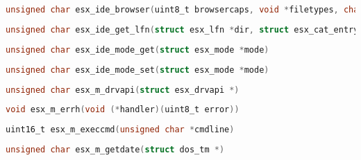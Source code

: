 \documentclass[11pt]{book}
\def\lthtmlcheckvsize{\ifdim\ht\sizebox<\vsize 
  \ifdim\wd\sizebox<\hsize\expandafter\hfill\fi \expandafter\vfill
  \else\expandafter\vss\fi}%
\begin{document}
{\newpage\clearpage
{}%
\begin{lstlisting}[language=C]
unsigned char esx_ide_browser(uint8_t browsercaps, void *filetypes, char *help,char *dst_sfn, char *dst_lfn)
\end{lstlisting}%
\lthtmlfigureZ
\lthtmlcheckvsize\clearpage}

{\newpage\clearpage
{}%
\begin{lstlisting}[language=C]
unsigned char esx_ide_get_lfn(struct esx_lfn *dir, struct esx_cat_entry *query)
\end{lstlisting}%
\lthtmlfigureZ
\lthtmlcheckvsize\clearpage}

{\newpage\clearpage
{}%
\begin{lstlisting}[language=C]
unsigned char esx_ide_mode_get(struct esx_mode *mode)
\end{lstlisting}%
\lthtmlfigureZ
\lthtmlcheckvsize\clearpage}

{\newpage\clearpage
{}%
\begin{lstlisting}[language=C]
unsigned char esx_ide_mode_set(struct esx_mode *mode)
\end{lstlisting}%
\lthtmlfigureZ
\lthtmlcheckvsize\clearpage}

{\newpage\clearpage
{}%
\begin{lstlisting}[language=C]
unsigned char esx_m_drvapi(struct esx_drvapi *)
\end{lstlisting}%
\lthtmlfigureZ
\lthtmlcheckvsize\clearpage}

{\newpage\clearpage
{}%
\begin{lstlisting}[language=C]
void esx_m_errh(void (*handler)(uint8_t error))
\end{lstlisting}%
\lthtmlfigureZ
\lthtmlcheckvsize\clearpage}

{\newpage\clearpage
{}%
\begin{lstlisting}[language=C]
uint16_t esx_m_execcmd(unsigned char *cmdline)
\end{lstlisting}%
\lthtmlfigureZ
\lthtmlcheckvsize\clearpage}

{\newpage\clearpage
{}%
\begin{lstlisting}[language=C]
unsigned char esx_m_getdate(struct dos_tm *)
\end{lstlisting}%
\lthtmlfigureZ
\lthtmlcheckvsize\clearpage}
\end{document}
